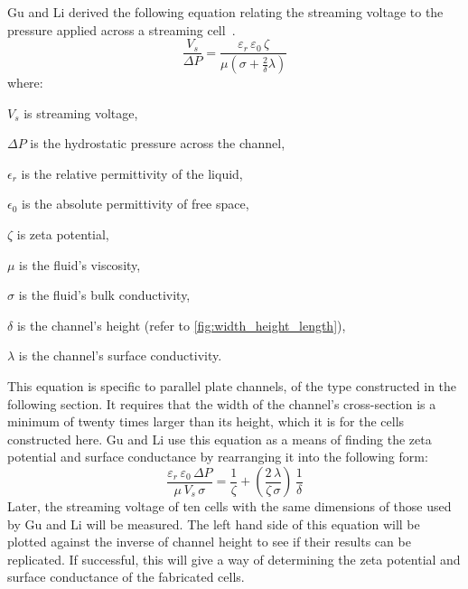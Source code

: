       Gu and Li derived the following equation relating the streaming voltage to the pressure applied across a streaming cell~\cite{Gu2000}.
      \begin{equation}
      \frac{V_{s}}{\Delta P} = \frac{\varepsilon_{r}\,\varepsilon_{0}\,\zeta}{\mu(\sigma+\frac{2}{\delta}\lambda)}
      \label{eq:part1_energyHarvesting_streamingVoltage}
      \end{equation}
      \noindent where:
      \begin{description}
          \item $V_{s}$ is streaming voltage,
          \item $\Delta P$ is the hydrostatic pressure across the channel,
          \item $\epsilon_{r}$ is the relative permittivity of the liquid,
          \item $\epsilon_{0}$ is the absolute permittivity of free space,
          \item $\zeta$ is zeta potential,
          \item $\mu$ is the fluid's viscosity,
          \item $\sigma$ is the fluid's bulk conductivity,
          \item $\delta$ is the channel's height (refer to \cref{fig:width_height_length}),
          \item $\lambda$ is the channel's surface conductivity.
      \end{description}
      This equation is specific to parallel plate channels, of the type constructed in the following section.
      It requires that the width of the channel's cross-section is a minimum of twenty times larger than its height, which it is for the cells constructed here.
      Gu and Li use this equation as a means of finding the zeta potential and surface conductance by rearranging it into the following form:
      \begin{equation}
        \frac{\varepsilon_{r}\, \varepsilon_{0}\, \Delta P}{\mu\, V_{s}\, \sigma} = \frac{1}{\zeta} + \left(\frac{2\, \lambda}{\zeta\, \sigma}\right)\, \frac{1}{\delta}
      \end{equation}
      Later, the streaming voltage of ten cells with the same dimensions of those used by Gu and Li will be measured.
      The left hand side of this equation will be plotted against the inverse of channel height to see if their results can be replicated.
      If successful, this will give a way of determining the zeta potential and surface conductance of the fabricated cells.


